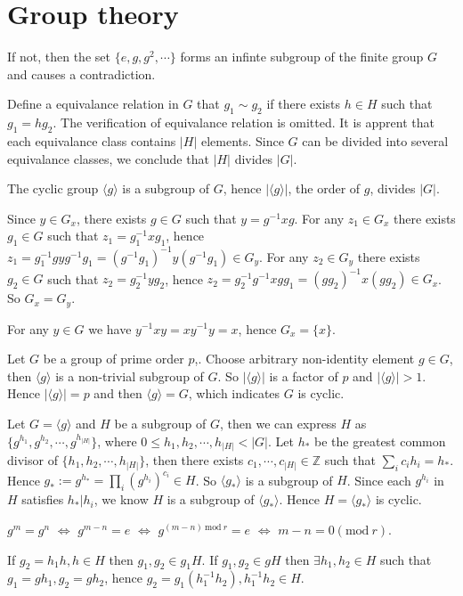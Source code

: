 \chapter{Group theory}

\ex If not, then the set $\{e, g, g^2, \cdots\}$ forms an infinte subgroup of the finite group $G$ and causes a contradiction.

\ex Define a equivalance relation in $G$ that $g_1\sim g_2$ if there exists $h\in H$ such that $g_1=hg_2$.
The verification of equivalance relation is omitted.
It is apprent that each equivalance class contains $|H|$ elements.
Since $G$ can be divided into several equivalance classes, we conclude that $|H|$ divides $|G|$.

\ex The cyclic group $\langle g\rangle$ is a subgroup of $G$, hence $|\langle g\rangle|$, the order of $g$, divides $|G|$.

\ex Since $y\in G_x$, there exists $g\in G$ such that $y=g^{-1}xg$.
For any $z_1\in G_x$ there exists $g_1\in G$ such that $z_1=g_1^{-1}xg_1$, hence $z_1=g_1^{-1}gyg^{-1}g_1=(g^{-1}g_1)^{-1}y(g^{-1}g_1)\in G_y$.
For any $z_2\in G_y$ there exists $g_2\in G$ such that $z_2=g_2^{-1}yg_2$, hence $z_2=g_2^{-1}g^{-1}xgg_1=(gg_2)^{-1}x(gg_2)\in G_x$.
So $G_x=G_y$.

\ex For any $y\in G$ we have $y^{-1}xy=xy^{-1}y=x$, hence $G_x=\{x\}$.

\ex Let $G$ be a group of prime order $p$,.
Choose arbitrary non-identity element $g\in G$, then $\langle g\rangle$ is a non-trivial subgroup of $G$.
So $|\langle g\rangle|$ is a factor of $p$ and $|\langle g\rangle|>1$.
Hence $|\langle g\rangle|=p$ and then $\langle g\rangle=G$, which indicates $G$ is cyclic.

\ex Let $G=\langle g\rangle$ and $H$ be a subgroup of $G$, then we can express $H$ as $\{g^{h_1},g^{h_2},\cdots,g^{h_{|H|}}\}$, where $0\le h_1,h_2,\cdots,h_{|H|}<|G|$.
Let $h_*$ be the greatest common divisor of $\{h_1,h_2,\cdots,h_{|H|}\}$, then there exists $c_1,\cdots,c_{|H|}\in\mathbb{Z}$ such that $\sum_ic_ih_i=h_*$.
Hence $g_*:=g^{h_*}=\prod_i\left(g^{h_i}\right)^{c_i}\in H$.
So $\langle g_*\rangle$ is a subgroup of $H$.
Since each $g^{h_i}$ in $H$ satisfies $h_*|h_i$, we know $H$ is a subgroup of $\langle g_*\rangle$.
Hence $H=\langle g_*\rangle$ is cyclic.

\ex $g^m=g^n$ $\Leftrightarrow$ $g^{m-n}=e$ $\Leftrightarrow$ $g^{(m-n)~\mathrm{mod}~r}=e$ $\Leftrightarrow$ $m-n=0(\mathrm{mod}~r)$.

\ex If $g_2=h_1h,h\in H$ then $g_1,g_2\in g_1H$.
If $g_1,g_2\in gH$ then $\exists h_1,h_2\in H$ such that $g_1=gh_1,g_2=gh_2$, hence $g_2=g_1(h_1^{-1}h_2),h_1^{-1}h_2\in H$.

